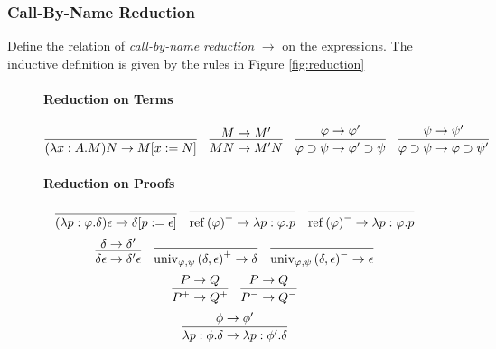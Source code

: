 \documentclass[a4paper,UKenglish]{lipics-v2016}
\newcommand*{\reff}[1]{\ensuremath{\mathrm{ref} \left( {#1} \right)}}
\newcommand*{\univ}[4]{\ensuremath{\mathrm{univ}_{{#1}, {#2}} \left({#3} , {#4} \right)}}
\theoremstyle{plain}
\theoremstyle{definition}
\begin{document}
\subsubsection{Call-By-Name Reduction}

\begin{definition}
Define the relation of \emph{call-by-name reduction} $\rightarrow$ on the expressions.  The inductive
definition is given by the rules in Figure \ref{fig:reduction}

\begin{figure}
\paragraph*{Reduction on Terms}
$$ \infer{(\lambda x:A.M)N \rightarrow M[x:=N]}{} \quad
\infer{MN \rightarrow M'N}{M \rightarrow M'} \quad
\infer{\varphi \supset \psi \rightarrow \varphi' \supset \psi}{\varphi \rightarrow \varphi'} \quad
\infer{\varphi \supset \psi \rightarrow \varphi \supset \psi'}{\psi \rightarrow \psi'} $$
\paragraph*{Reduction on Proofs}
$$\infer{(\lambda p : \varphi . \delta)\epsilon \rightarrow \delta [ p := \epsilon ]}{} \quad
\infer{\reff{\varphi}^+ \rightarrow \lambda p : \varphi . p}{} \quad
\infer{\reff{\varphi}^- \rightarrow \lambda p : \varphi . p}{} $$
$$ \infer{\delta \epsilon \rightarrow \delta' \epsilon}{\delta \rightarrow \delta'} \quad
\infer{\univ{\varphi}{\psi}{\delta}{\epsilon}^+ \rightarrow \delta}{} \quad
\infer{\univ{\varphi}{\psi}{\delta}{\epsilon}^- \rightarrow \epsilon}{} $$
$$ \infer{P^+ \rightarrow Q^+}{P \rightarrow Q} \quad
\infer{P^- \rightarrow Q^-}{P \rightarrow Q}$$
$$ \infer{\lambda p:\phi.\delta \rightarrow \lambda p:\phi'.\delta}{\phi \rightarrow \phi'} $$

\end{figure}
\end{definition}
\end{document}
